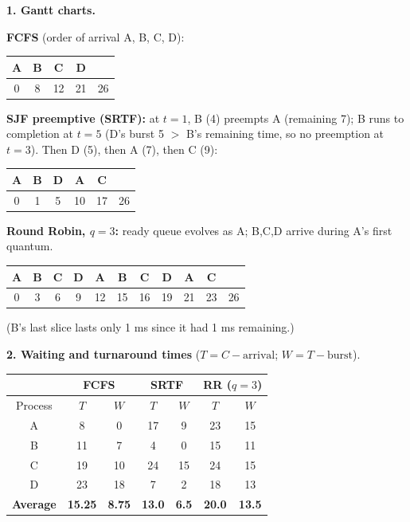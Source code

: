 \documentclass[11pt]{article}
\begin{document}
\begin{corrige}
\textbf{1. Gantt charts.}

\textbf{FCFS} (order of arrival A, B, C, D):
\begin{center}
\begin{tabular}{|c|c|c|cc|}\hline
A & B & C & D \\ \hline
0 & 8 & 12 & 21 & 26 \\ \hline
\end{tabular}
\end{center}

\textbf{SJF preemptive (SRTF):} at $t=1$, B (4) preempts A (remaining 7); B runs to completion at $t=5$ (D's burst 5 $>$ B's remaining time, so no preemption at $t=3$). Then D (5), then A (7), then C (9):
\begin{center}
\begin{tabular}{|c|c|c|c|cc|}\hline
A & B & D & A & C \\ \hline
0 & 1 & 5 & 10 & 17 & 26 \\ \hline
\end{tabular}
\end{center}

\textbf{Round Robin, $q=3$:} ready queue evolves as A; B,C,D arrive during A's first quantum.
\begin{center}
\begin{tabular}{|c|c|c|c|c|c|c|c|c|cc|}\hline
A & B & C & D & A & B & C & D & A & C \\ \hline
0 & 3 & 6 & 9 & 12 & 15 & 16 & 19 & 21 & 23 & 26 \\ \hline
\end{tabular}
\end{center}
(B's last slice lasts only 1 ms since it had 1 ms remaining.)

\textbf{2. Waiting and turnaround times} ($T = C - \text{arrival}$; $W = T - \text{burst}$).

\begin{center}
\begin{tabular}{|c|c|c|c|c|c|c|}\hline
\rowcolor{popblueL} & \multicolumn{2}{c|}{FCFS} & \multicolumn{2}{c|}{SRTF} & \multicolumn{2}{c|}{RR ($q=3$)} \\ \hline
Process & $T$ & $W$ & $T$ & $W$ & $T$ & $W$ \\ \hline
A & 8 & 0 & 17 & 9 & 23 & 15 \\ \hline
B & 11 & 7 & 4 & 0 & 15 & 11 \\ \hline
C & 19 & 10 & 24 & 15 & 24 & 15 \\ \hline
D & 23 & 18 & 7 & 2 & 18 & 13 \\ \hline
\textbf{Average} & \textbf{15.25} & \textbf{8.75} & \textbf{13.0} & \textbf{6.5} & \textbf{20.0} & \textbf{13.5} \\ \hline
\end{tabular}
\end{center}


\end{corrige}
\end{document}
